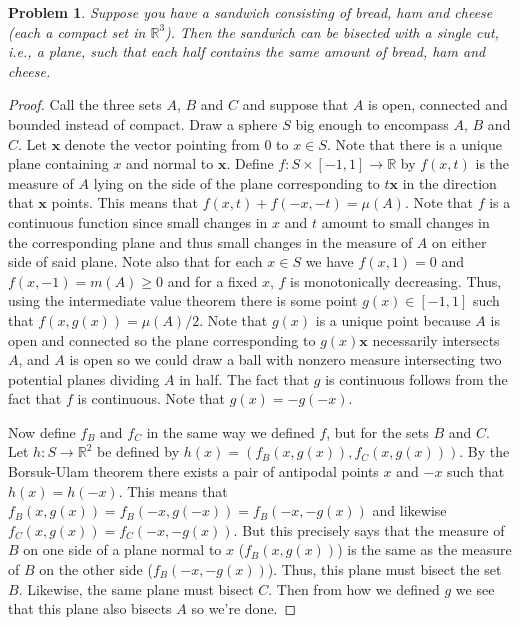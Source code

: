 \documentclass{article}
\newtheorem{problem}{Problem}
\begin{document}
\begin{problem}
Suppose you have a sandwich consisting of bread, ham and cheese (each a compact set in $\mathbb{R}^3$). Then the sandwich can be bisected with a single cut, i.e., a plane, such that each half contains the same amount of bread, ham and cheese.
\end{problem}
\begin{proof}
Call the three sets $A$, $B$ and $C$ and suppose that $A$ is open, connected and bounded instead of compact. Draw a sphere $S$ big enough to encompass $A$, $B$ and $C$. Let $\mathbf{x}$ denote the vector pointing from $0$ to $x \in S$. Note that there is a unique plane containing $x$ and normal to $\mathbf{x}$. Define $f : S \times [-1,1] \to \mathbb{R}$ by $f(x,t)$ is the measure of $A$ lying on the side of the plane corresponding to $t\mathbf{x}$ in the direction that $\mathbf{x}$ points. This means that $f(x,t) + f(-x,-t) = \mu(A)$.
\vspace{100pt}
Note that $f$ is a continuous function since small changes in $x$ and $t$ amount to small changes in the corresponding plane and thus small changes in the measure of $A$ on either side of said plane. Note also that for each $x \in S$ we have $f(x,1) = 0$ and $f(x,-1) = m(A) \geq 0$ and for a fixed $x$, $f$ is monotonically decreasing. Thus, using the intermediate value theorem there is some point $g(x) \in [-1,1]$ such that $f(x,g(x)) = \mu(A)/2$. Note that $g(x)$ is a unique point because $A$ is open and connected so the plane corresponding to $g(x)\mathbf{x}$ necessarily intersects $A$, and $A$ is open so we could draw a ball with nonzero measure intersecting two potential planes dividing $A$ in half. The fact that $g$ is continuous follows from the fact that $f$ is continuous. Note that $g(x) = -g(-x)$.

Now define $f_B$ and $f_C$ in the same way we defined $f$, but for the sets $B$ and $C$. Let $h : S \to \mathbb{R}^2$ be defined by $h(x) = (f_B(x,g(x)), f_C(x,g(x)))$. By the Borsuk-Ulam theorem there exists a pair of antipodal points $x$ and $-x$ such that $h(x) = h(-x)$. This means that $f_B(x,g(x)) = f_B(-x,g(-x)) = f_B(-x,-g(x))$ and likewise $f_C(x,g(x)) = f_C(-x,-g(x))$. But this precisely says that the measure of $B$ on one side of a plane normal to $x$ ($f_B(x,g(x))$) is the same as the measure of $B$ on the other side ($f_B(-x,-g(x))$). Thus, this plane must bisect the set $B$. Likewise, the same plane must bisect $C$. Then from how we defined $g$ we see that this plane also bisects $A$ so we're done.
\end{proof}
\end{document}
